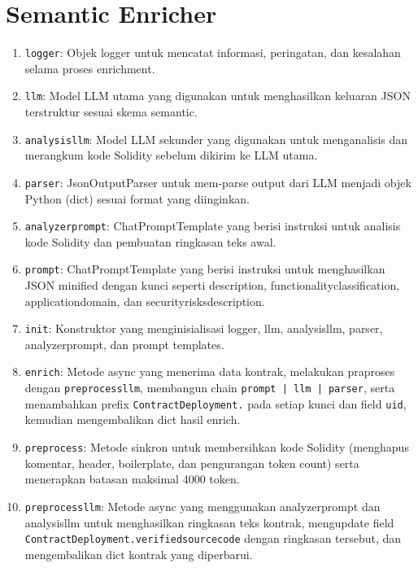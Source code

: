\chapter{Semantic Enricher}
\label{appendix:semantic-enricher}

\begin{enumerate}
    \item \texttt{logger}: Objek logger untuk mencatat informasi, peringatan, dan kesalahan selama proses enrichment.
    \item \texttt{llm}: Model LLM utama yang digunakan untuk menghasilkan keluaran JSON terstruktur sesuai skema semantic.
    \item \texttt{analysis\textunderscore llm}: Model LLM sekunder yang digunakan untuk menganalisis dan merangkum kode Solidity sebelum dikirim ke LLM utama.
    \item \texttt{parser}: JsonOutputParser untuk mem-parse output dari LLM menjadi objek Python (dict) sesuai format yang diinginkan.
    \item \texttt{analyzer\textunderscore prompt}: ChatPromptTemplate yang berisi instruksi untuk analisis kode Solidity dan pembuatan ringkasan teks awal.
    \item \texttt{prompt}: ChatPromptTemplate yang berisi instruksi untuk menghasilkan JSON minified dengan kunci seperti description, functionality\textunderscore classification, application\textunderscore domain, dan security\textunderscore risks\textunderscore description.
    \item \texttt{\textunderscore init\textunderscore }: Konstruktor yang menginisialisasi logger, llm, analysis\textunderscore llm, parser, analyzer\textunderscore prompt, dan prompt templates.
    \item \texttt{enrich}: Metode async yang menerima data kontrak, melakukan praproses dengan \texttt{preprocess\textunderscore llm}, membangun chain \texttt{prompt | llm | parser}, serta menambahkan prefix \texttt{ContractDeployment.} pada setiap kunci dan field \texttt{uid}, kemudian mengembalikan dict hasil enrich.
    \item \texttt{preprocess}: Metode sinkron untuk membersihkan kode Solidity (menghapus komentar, header, boilerplate, dan pengurangan token count) serta menerapkan batasan maksimal 4000 token.
    \item \texttt{preprocess\textunderscore llm}: Metode async yang menggunakan analyzer\textunderscore prompt dan analysis\textunderscore llm untuk menghasilkan ringkasan teks kontrak, mengupdate field \texttt{ContractDeployment.verified\textunderscore source\textunderscore code} dengan ringkasan tersebut, dan mengembalikan dict kontrak yang diperbarui.
\end{enumerate}